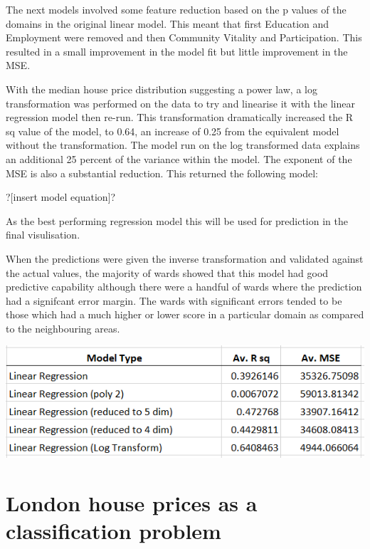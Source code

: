 The next models involved some feature reduction based on the p values of the domains in the original linear model. This meant that first Education and Employment were removed and then Community Vitality and Participation. This resulted in a small improvement in the model fit but little improvement in the MSE. 

With the median house price distribution suggesting a power law, a log transformation was performed on the data to try and linearise it with the linear regression model then re-run. This transformation dramatically increased the R sq value of the model, to 0.64, an increase of 0.25 from the equivalent model without the transformation. The model run on the log transformed data explains an additional 25 percent of the variance within the model. The exponent of the MSE is also a substantial reduction. This returned the following model:

?[insert model equation]?

As the best performing regression model this will be used for prediction in the final visulisation.

When the predictions were given the inverse transformation and validated against the actual values, the majority of wards showed that this model had good predictive capability although there were a handful of wards where the prediction had a signifcant error margin. The wards with significant errors tended to be those which had a much higher or lower score in a particular domain as compared to the neighbouring areas.

\includegraphics[scale=1]{figures/regression_results} %



\section{London house prices as a classification problem}

